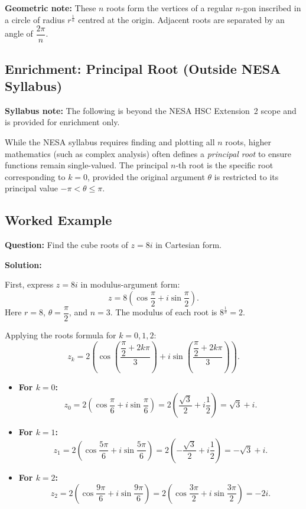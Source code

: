 \documentclass[12pt]{article}
\begin{document}
\textbf{Geometric note:} These $n$ roots form the vertices of a regular $n$-gon inscribed in a circle of radius $r^{\frac{1}{n}}$ centred at the origin. Adjacent roots are separated by an angle of $\dfrac{2\pi}{n}$.

\subsection{Enrichment: Principal Root (Outside NESA Syllabus)}
\textbf{Syllabus note:} The following is beyond the NESA HSC Extension~2 scope and is provided for enrichment only.

While the NESA syllabus requires finding and plotting all $n$ roots, higher mathematics (such as complex analysis) often defines a \emph{principal root} to ensure functions remain single-valued. The principal $n$-th root is the specific root corresponding to $k = 0$, provided the original argument $\theta$ is restricted to its principal value $-\pi < \theta \le \pi$.

\subsection{Worked Example}

\textbf{Question:} Find the cube roots of $z = 8i$ in Cartesian form.

\textbf{Solution:}

First, express $z = 8i$ in modulus-argument form:
\[
  z = 8\!\left(\cos\!\frac{\pi}{2} + i\sin\!\frac{\pi}{2}\right).
\]
Here $r = 8$, $\theta = \dfrac{\pi}{2}$, and $n = 3$. The modulus of each root is $8^{\frac{1}{3}} = 2$.

Applying the roots formula for $k = 0, 1, 2$:
\[
  z_k = 2\left(
    \cos\!\left(\frac{\dfrac{\pi}{2} + 2k\pi}{3}\right)
    + i\sin\!\left(\frac{\dfrac{\pi}{2} + 2k\pi}{3}\right)
  \right).
\]

\begin{itemize}[leftmargin=*]
  \item \textbf{For $k = 0$:}
  \[
    z_0 = 2\!\left(\cos\frac{\pi}{6} + i\sin\frac{\pi}{6}\right)
        = 2\!\left(\frac{\sqrt{3}}{2} + i\frac{1}{2}\right)
        = \sqrt{3} + i.
  \]

  \item \textbf{For $k = 1$:}
  \[
    z_1 = 2\!\left(\cos\frac{5\pi}{6} + i\sin\frac{5\pi}{6}\right)
        = 2\!\left(-\frac{\sqrt{3}}{2} + i\frac{1}{2}\right)
        = -\sqrt{3} + i.
  \]

  \item \textbf{For $k = 2$:}
  \[
    z_2 = 2\!\left(\cos\frac{9\pi}{6} + i\sin\frac{9\pi}{6}\right)
        = 2\!\left(\cos\frac{3\pi}{2} + i\sin\frac{3\pi}{2}\right)
        = -2i.
  \]
\end{itemize}
\end{document}
